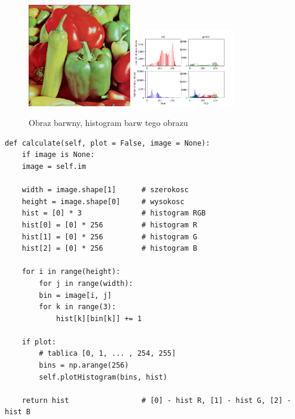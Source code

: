 \documentclass[final,a4paper,openany,12pt]{mwbk}
\begin{document}
\begin{figure}[H]
	\begin{center}
		\includegraphics[width=0.4\textwidth]{peppers_color}
		\includegraphics[width=0.4\textwidth]{peppers_color_histogram}
	\end{center}
	\caption{Obraz barwny, histogram barw tego obrazu}
\end{figure}
\pagebreak


\begin{lstlisting}[caption=Obliczanie histogramu]
def calculate(self, plot = False, image = None):
	if image is None:
	image = self.im
	
	width = image.shape[1]      # szerokosc
	height = image.shape[0]     # wysokosc
	hist = [0] * 3              # histogram RGB
	hist[0] = [0] * 256         # histogram R
	hist[1] = [0] * 256         # histogram G
	hist[2] = [0] * 256         # histogram B
	
	for i in range(height):
		for j in range(width):
		bin = image[i, j]
		for k in range(3):
			hist[k][bin[k]] += 1
	
	if plot:
		# tablica [0, 1, ... , 254, 255]
		bins = np.arange(256)
		self.plotHistogram(bins, hist)
	
	return hist                 # [0] - hist R, [1] - hist G, [2] - hist B
\end{lstlisting}
\end{document}
